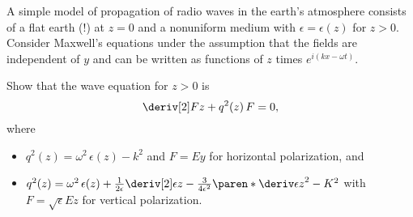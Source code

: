 \documentclass{phys151}
\begin{document}
\begin{solution}
  
\end{solution}

\begin{problem}
  A simple model of propagation of radio waves in the earth's atmosphere
  consists of a flat earth (!) at \(z=0\) and a nonuniform medium with
  \(\epsilon=\epsilon(z)\) for \(z>0\).  Consider Maxwell's equations under the
  assumption that the fields are independent of \(y\) and can be written as
  functions of \(z\) times \(e^{i(kx-\omega t)}\).

  Show that the wave equation for \(z>0\) is
  \[
    \deriv[2] F z + q^2(z) \, F = 0,
  \]
  where
  \begin{itemize}
    \item \(q^2(z) = \omega^2 \, \epsilon(z) - k^2\) and \(F=Ey\) for
      horizontal polarization, and
    \item \(q^2(z) = \omega^2 \, \epsilon(z) + \frac 1 {2\epsilon} \deriv[2]
      \epsilon z - \frac 3 {4\epsilon^2} \paren*{\deriv \epsilon z}^2 - K^2\)
      with \(F = \sqrt\epsilon E z\) for vertical polarization.
  \end{itemize}
\end{problem}

\begin{solution}
  
\end{solution}
\end{document}
